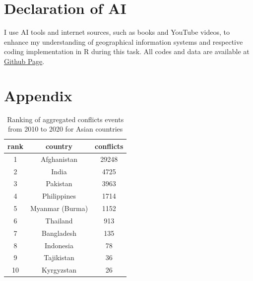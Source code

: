 \documentclass[12pt]{article}
\begin{document}
\section{Declaration of AI}
I use AI tools and internet sources, such as books and YouTube videos, to enhance my understanding of geographical information systems and respective coding implementation in R during this task. All codes and data are available at \href{https://github.com/YingYan77/thailand-conflict}{Github Page}. 

\printbibliography

\appendix
\section{Appendix} 
\begin{table}[htbp]
    \centering
    \begin{tabular}{ccc}
\toprule
rank & country & conflicts\\
\midrule
1 & Afghanistan & 29248\\
2 & India & 4725\\
3 & Pakistan & 3963\\
4 & Philippines & 1714\\
5 & Myanmar (Burma) & 1152\\
6 & Thailand & 913\\
7 & Bangladesh & 135\\
8 & Indonesia & 78\\
9 & Tajikistan & 36\\
10 & Kyrgyzstan & 26\\
\bottomrule
\end{tabular}
    \caption{Ranking of aggregated conflicts events from 2010 to 2020 for Asian countries}
    \label{tab:my_label}
\end{table}
\end{document}
